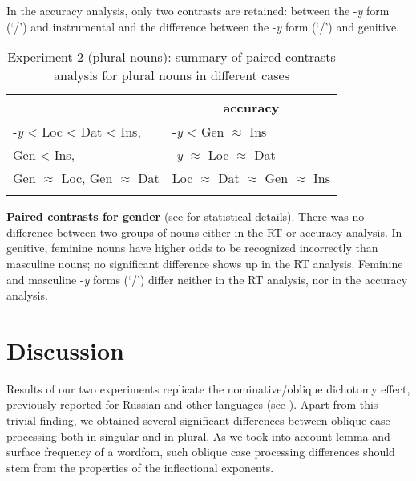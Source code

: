 \documentclass[output=paper, modfonts,newtxmath,hidelinks]{langscibook}
\begin{document}
In the accuracy analysis, only two contrasts are retained: between the -\textit{y} form (`\nomm/\accc') and instrumental and the difference between the -\textit{y} form (`\nomm/\accc') and genitive.

\begin{table}
    \centering
	\caption{Experiment 2 (plural nouns): summary of paired contrasts analysis for plural nouns in different cases}
    \label{tab:casePlHierarchy}
    \begin{tabular}{*{2}l}
    \lsptoprule
    \multicolumn{1}{c}{RTs}	&	\multicolumn{1}{c}{accuracy}\\
    \midrule
    -\textit{y}	< Loc < Dat < Ins,	&	-\textit{y} < Gen $\approx$ Ins \\
    Gen < Ins,	&	-\textit{y} $\approx$ Loc $\approx$ Dat\\
    Gen $\approx$ Loc, Gen $\approx$ Dat & Loc $\approx$	Dat $\approx$ Gen $\approx$  Ins\\
    \lspbottomrule
    \end{tabular}
\end{table}    

\textbf{Paired contrasts for gender} (see  for statistical details). There was no difference between two groups of nouns either in the RT or accuracy analysis. In genitive, feminine  nouns have higher odds to be recognized incorrectly than masculine nouns; no significant difference shows up in the RT analysis. Feminine and masculine -\textit{y} forms (`\nomm/\accc') differ neither in the RT analysis, nor in the accuracy analysis. 

\section{Discussion}
Results of our two experiments replicate the nominative\slash oblique dichotomy effect, previously reported for Russian and other languages (see ). Apart from this trivial finding, we obtained several significant differences between oblique case processing both in singular and in plural. As we took into account lemma and surface frequency of a wordfom, such oblique case processing differences should stem from the properties of the inflectional exponents.\\
\end{document}
